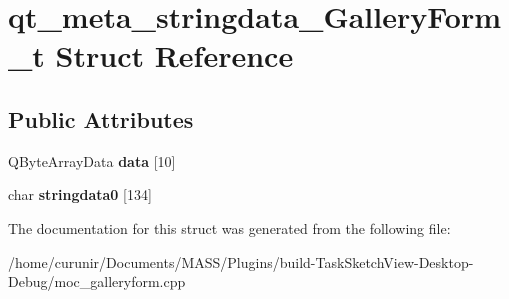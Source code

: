 \hypertarget{structqt__meta__stringdata___gallery_form__t}{}\section{qt\+\_\+meta\+\_\+stringdata\+\_\+\+Gallery\+Form\+\_\+t Struct Reference}
\label{structqt__meta__stringdata___gallery_form__t}
\subsection*{Public Attributes}
\begin{DoxyCompactItemize}
\item 
Q\+Byte\+Array\+Data {\bfseries data} \mbox{[}10\mbox{]}\hypertarget{structqt__meta__stringdata___gallery_form__t_abeb7d89e67120407601d93347f648873}{}\label{structqt__meta__stringdata___gallery_form__t_abeb7d89e67120407601d93347f648873}

\item 
char {\bfseries stringdata0} \mbox{[}134\mbox{]}\hypertarget{structqt__meta__stringdata___gallery_form__t_a395abaacd985ccdc8f873aad90e44514}{}\label{structqt__meta__stringdata___gallery_form__t_a395abaacd985ccdc8f873aad90e44514}

\end{DoxyCompactItemize}


The documentation for this struct was generated from the following file\+:\begin{DoxyCompactItemize}
\item 
/home/curunir/\+Documents/\+M\+A\+S\+S/\+Plugins/build-\/\+Task\+Sketch\+View-\/\+Desktop-\/\+Debug/moc\+\_\+galleryform.\+cpp\end{DoxyCompactItemize}
